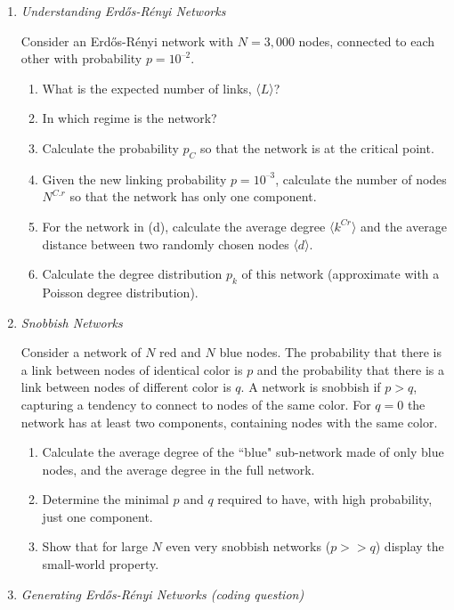 \documentclass[12pt,letterpaper]{article}
\begin{document}
\begin{enumerate}
\item \textit{Understanding Erdős-Rényi Networks}

Consider an Erdős-Rényi network with $N = 3,000$ nodes, connected to each other with probability $p = 10^{–2}$.
\begin{enumerate}
    \item What is the expected number of links, 〈$L$〉?
\item In which regime is the network?
\item Calculate the probability $p_C$ so that the network is at the critical point.
\item Given the new linking probability $p = 10^{–3}$, calculate the number of nodes $N^{C.r}$ so that the network has only one component.
\item For the network in (d), calculate the average degree 〈$k^{Cr}$〉 and the average distance between two randomly chosen nodes 〈$d$〉.
\item Calculate the degree distribution $p_k$ of this network (approximate with a Poisson degree distribution).

\end{enumerate}

\item \textit{Snobbish Networks}

Consider a network of $N$ red and $N$ blue nodes. The probability that there is a link between nodes of identical color is $p$ and the probability that there is a link between nodes of different color is $q$. A network is snobbish if $p > q$, capturing a tendency to connect to nodes of the same color. For $q = 0$ the network has at least two components, containing nodes with the same color.

\begin{enumerate}
    \item Calculate the average degree of the ``blue" sub-network made of only blue nodes, and the average degree in the full network.
\item Determine the minimal $p$ and $q$ required to have, with high probability, just one component.
\item Show that for large $N$ even very snobbish networks ($p>>q$) display the small-world property.
\end{enumerate}


\item \textit{Generating Erdős-Rényi Networks (coding question)}


\end{enumerate}
\end{document}
